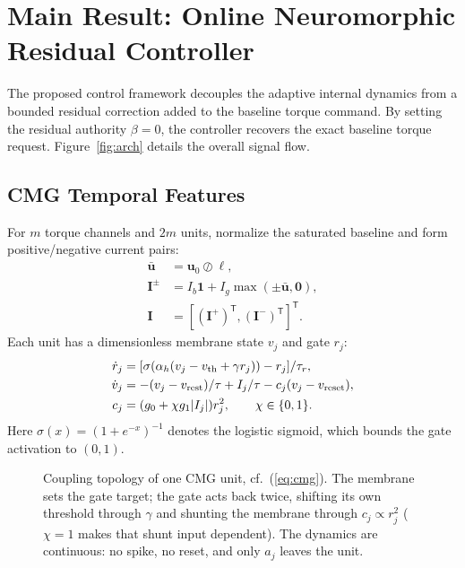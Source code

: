 \documentclass[letterpaper, 10 pt, conference]{ieeeconf}
\newcommand{\T}{^{\mathsf T}}
\begin{document}
\section{Main Result: Online Neuromorphic Residual Controller}
\label{sec:main}
The proposed control framework decouples the adaptive internal dynamics from a bounded residual correction added to the baseline torque command. By setting the residual authority $\beta = 0$, the controller recovers the exact baseline torque request. Figure~\ref{fig:arch} details the overall signal flow.


\subsection{CMG Temporal Features}

For $m$ torque channels and $2m$ units, normalize the saturated baseline and
form positive/negative current pairs:
\begin{equation}
 \begin{aligned}
 \bar{\bm u}&=\bm u_0\oslash\bm\ell,\\
 \bm I^{\pm}&=I_b\bm1+I_g\max(\pm\bar{\bm u},\bm0),\\
 \bm I&=[(\bm I^+)\T,(\bm I^-)\T]\T.
 \end{aligned}
 \label{eq:encoding}
\end{equation}
Each unit has a dimensionless membrane state $v_j$ and gate $r_j$:
\begin{align}
 \dot r_j&=[\sigma(\alpha_h(v_j-v_{\rm th}+\gamma r_j))-r_j]/\tau_r,\\
 \dot v_j&=-(v_j-v_{\rm rest})/\tau+I_j/\tau-c_j(v_j-v_{\rm reset}),\\
 c_j&=(g_0+\chi g_1|I_j|)r_j^2,\qquad \chi\in\{0,1\}.
 \label{eq:cmg}
\end{align}
Here $\sigma(x)=(1+e^{-x})^{-1}$ denotes the logistic sigmoid, which bounds the gate activation to $(0,1)$.

\begin{figure}[t]
\centering
\resizebox{0.86\columnwidth}{!}{}
\caption{Coupling topology of one CMG unit, cf.~(\ref{eq:cmg}). The membrane sets
 the gate target; the gate acts back twice, shifting its own threshold through
 $\gamma$ and shunting the membrane through $c_j\propto r_j^2$ ($\chi=1$ makes
 that shunt input dependent). The dynamics are continuous: no spike, no reset,
 and only $a_j$ leaves the unit.}
\label{fig:cmgunit}
\end{figure}
\end{document}
